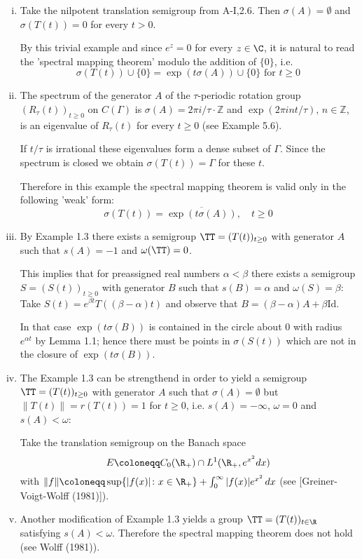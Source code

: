 \begin{enumerate}[(i), wide]

\item 
Take the nilpotent translation semigroup from A-I,2.6. Then $\sigma(A) = \emptyset$ and $\sigma(T(t)) = 0$ for every $t > 0$.

By this trivial example and since $e^{z} = 0$ for every $z \in \C$, it is natural to read the 'spectral mapping theorem' modulo the addition of $\{0\}$, i.e.
\[
\sigma(T(t)) \cup \{0\} = \exp(t\sigma(A)) \cup \{0\} \text{ for } t \geq 0
\]
\item 
The spectrum of the generator $A$ of the $\tau$-periodic rotation group $(R_{\tau}(t))_{t \geq 0}$ on $C(\Gamma)$ is $\sigma(A) = 2\pi i/\tau\cdot\mathbb{Z}$ and $\exp(2\pi int/\tau)$, $n \in \mathbb{Z}$, is an eigenvalue of $R_{\tau}(t)$ for every $t \geq 0$ (see Example 5.6).

If $t/\tau$ is irrational these eigenvalues form a dense subset of $\Gamma$.
Since the spectrum is closed we obtain $\sigma(T(t)) = \Gamma$ for these $t$.

Therefore in this example the spectral mapping theorem is valid only in the following 'weak' form:
\[
\sigma(T(t)) = \overline{\exp(t\sigma(A))}, \quad t \geq 0
\]

\item By Example 1.3 there exists a semigroup $\TT = (T(t))_{t \geq 0}$ with generator $A$ such that $s(A) = -1$ and $\omega(\TT) = 0$.

This implies that for preassigned real numbers $\alpha < \beta$ there exists a semigroup $S = (S(t))_{t \geq 0}$ with generator $B$ such that $s(B) = \alpha$ and $\omega(S) = \beta$: Take $S(t) = e^{\beta t}T((\beta - \alpha)t)$ and observe that $B = (\beta-\alpha)A + \beta\text{Id}$.

In that case $\exp(t\sigma(B))$ is contained in the circle about $0$ with radius $e^{\alpha t}$ by Lemma 1.1; hence there must be points in $\sigma(S(t))$ which are not in the closure of $\exp(t\sigma(B))$.

\item The Example 1.3 can be strengthend in order to yield a semigroup $\TT = (T(t))_{t \geq 0}$ with generator $A$ such that $\sigma(A) = \emptyset$ but $\|T(t)\| = r(T(t)) = 1$ for $t \geq 0$, i.e. $s(A) = -\infty$, $\omega = 0$ and $s(A) < \omega$:


\newpage

Take the translation semigroup on the Banach space
\[
E \coloneqq C_{0}(\R_{+}) \cap L^{1}(\R_{+}, e^{x^{2}}dx)
\]
with $\|f\| \coloneqq \sup \{|f(x)| \colon x \in \R_{+}\} + \int_{0}^{\infty} |f(x)|e^{x^{2}} \, dx$ (see [Greiner-Voigt-Wolff (1981)]).

\item Another modification of Example 1.3 yields a group $\TT = (T(t))_{t \in \R}$ satisfying $s(A) < \omega$.
Therefore the spectral mapping theorem does not hold (see Wolff (1981)).
\end{enumerate}


